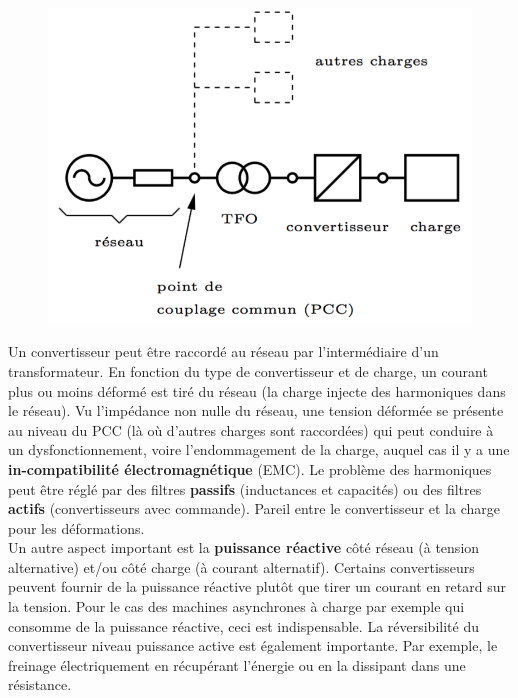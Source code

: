 		\begin{figure}
		\vspace{-5mm}
		\includegraphics[scale=0.25]{ch1/5}
		\end{figure}		
		Un convertisseur peut être raccordé au réseau par l'intermédiaire d'un transformateur. En fonction du type de convertisseur et de charge, un courant plus ou moins déformé est tiré du réseau (la charge injecte des harmoniques dans le réseau). Vu l'impédance non nulle du réseau, une tension déformée se présente au niveau du PCC (là où d'autres charges sont raccordées) qui peut conduire à un dysfonctionnement, voire l'endommagement de la charge, auquel cas il y a une \textbf{in-compatibilité électromagnétique} (EMC). Le problème des harmoniques peut être réglé par des filtres \textbf{passifs} (inductances et capacités) ou des filtres \textbf{actifs} (convertisseurs avec commande). Pareil entre le convertisseur et la charge pour les déformations. \\
		
		Un autre aspect important est la \textbf{puissance réactive} côté réseau (à tension alternative) et/ou côté charge (à courant alternatif). Certains convertisseurs peuvent fournir de la puissance réactive plutôt que tirer un courant en retard sur la tension. Pour le cas des machines asynchrones à charge par exemple qui consomme de la puissance réactive, ceci est indispensable. La réversibilité du convertisseur niveau puissance active est également importante. Par exemple, le freinage électriquement en récupérant l'énergie ou en la dissipant dans une résistance. 
		

